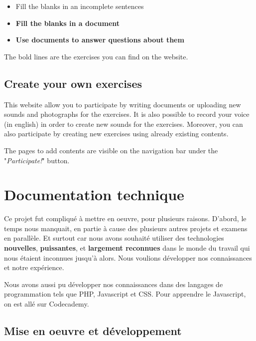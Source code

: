 \documentclass[12pt,a4paper]{report}
\begin{document}
\begin{itemize}
\item Fill the blanks in an incomplete sentences
\item \textbf{Fill the blanks in a document}
\item \textbf{Use documents to answer questions about them}
\end{itemize}

The bold lines are the exercises you can find on the website.

\subsection{Create your own exercises}

This website allow you to participate by writing documents or uploading new
sounds and photographs for the exercises. It is also possible to record your
voice (in english) in order to create new sounds for the exercises. Moreover,
you can also participate by creating new exercises using already existing
contents.

The pages to add contents are visible on the navigation bar
under the "\textit{Participate!}" button.

\pagebreak

\section{Documentation technique}

Ce projet fut compliqué à mettre en oeuvre, pour plusieurs raisons. D'abord, le temps nous manquait, en partie à cause des plusieurs autres projets et examens en parallèle. Et surtout car nous avons souhaité utiliser des technologies \textbf{nouvelles}, \textbf{puissantes}, et \textbf{largement reconnues} dans le monde du travail qui nous étaient inconnues jusqu'à alors. Nous voulions développer nos connaissances et notre expérience. 

Nous avons aussi pu développer nos connaissances dans des langages de
programmation tels que PHP\cite{php}, Javascript\cite{javascript} et
CSS\cite{css}. Pour apprendre le Javascript, on est allé sur Codecademy\cite{codecademy}.




\subsection{Mise en oeuvre et développement}
\end{document}
